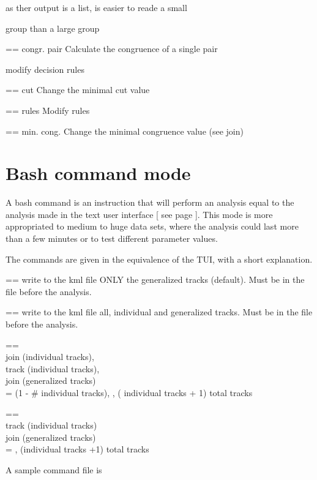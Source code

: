 						as ther output is a list, is easier to reade a small 

						group than a large group
							

	 == congr. pair	Calculate the congruence of a single pair 
	

	modify decision rules
	
	 == cut			Change the minimal cut value

	 == rules			Modify rules 

	 == min. cong.		Change the minimal congruence value (see join)
	


\section{Bash command mode}
\label{bash_commands}

A bash command is an instruction that will perform an analysis equal to the analysis made in the text user interface [ see page \pageref{tui_commands}]. This mode is more appropriated to medium to huge data sets, where the analysis could last more than a few minutes or to test different parameter values. 

The commands are given in the equivalence of the TUI, with a short explanation.


		 == 	write to the kml file ONLY the generalized tracks (default). Must be in the file before the analysis. 

		 == 	write to the kml file all, individual and generalized tracks. Must be in the file before the analysis.


		 ==\\ 	join (individual tracks),\\ 
							track  (individual tracks),\\ 
							join (generalized tracks) \\
=  (1 - \# individual tracks), %
,
 ( individual tracks + 1) total tracks

		 == \\	track  (individual tracks)\\ 
							join (generalized tracks)\\ 
= ,  (individual tracks +1) total tracks



A sample command file is 


\\
\\
\\
\\
\\
\\
\\

